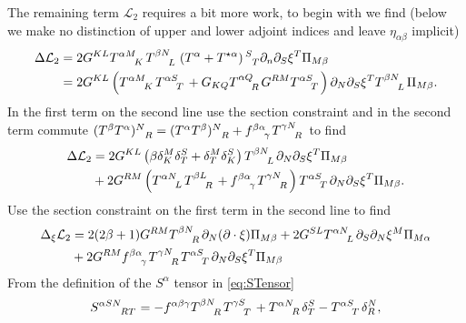 The remaining term $\mathcal{L}_2$ requires a bit more work, to begin with we find (below we make no distinction of upper and lower adjoint indices and leave $\eta_{\alpha\beta}$ implicit)
\begin{equation}
    \begin{aligned}
    \Delta \mathcal{L}_2 &= 2G^{KL}\tensor{T}{^{\alpha M}_K}\tensor{T}{^{\beta N}_L}\left(T^\alpha+T^{\star\alpha}\right)\tensor{}{^S_T}\pd_n\pd_S\xi^T\Pi_{M\beta}\\
    &= 2G^{KL}\left(\tensor{T}{^{\alpha M}_K}\tensor{T}{^{\alpha S}_T}+G_{KQ}\tensor{T}{^{\alpha Q}_R}G^{RM}\tensor{T}{^{\alpha S}_T}\right)\pd_N\pd_S\xi^T\tensor{T}{^{\beta N}_L}\Pi_{M\beta}.
    \end{aligned}
\end{equation}
In the first term on the second line use the section constraint and in the second term commute $(T^\beta T^\alpha)\tensor{}{^N_R} = (T^{\alpha}T^\beta)\tensor{}{^N_R}+\tensor{f}{^{\beta\alpha}_\gamma}\tensor{T}{^{\gamma N}_R}$ to find 
\begin{equation}
    \begin{aligned}
        \Delta \mathcal{L}_2 &= 2G^{KL}\left(\beta\delta^M_K\delta^S_T+\delta^M_T\delta^S_K\right)\tensor{T}{^{\beta N}_L}\pd_N\pd_S\xi^T\Pi_{M\beta}\\
        &+ 2G^{RM}\left(\tensor{T}{^{\alpha N}_L}\tensor{T}{^{\beta L}_R}+\tensor{f}{^{\beta\alpha}_\gamma}\tensor{T}{^{\gamma N}_R}\right)\tensor{T}{^{\alpha S}_T}\pd_N\pd_S\xi^T\Pi_{M\beta}.
    \end{aligned}
\end{equation}
Use the section constraint on the first term in the second line to find 
\begin{equation}\label{eq:Peter}
    \begin{aligned}
        \Delta_\xi \mathcal{L}_2 &= 2(2\beta+1)G^{RM}\tensor{T}{^{\beta N}_R}\pd_N(\pd\cdot\xi)\Pi_{M\beta}+2G^{SL}\tensor{T}{^{\alpha N}_L}\pd_S\pd_N\xi^M\Pi_{M\alpha}\\
        &+2G^{RM}\tensor{f}{^{\beta\alpha}_\gamma}\tensor{T}{^{\gamma N}_R}\tensor{T}{^{\alpha S}_T}\pd_N\pd_S\xi^T\Pi_{M\beta}
    \end{aligned}
\end{equation}
From the definition of the $S^\alpha$ tensor in \eqref{eq:STensor}
\begin{equation}
    \tensor{S}{^{\alpha SN}_{RT}} = -\tensor{f}{^{\alpha\beta\gamma}}\tensor{T}{^{\beta N}_R}\tensor{T}{^{\gamma S}_T}+\tensor{T}{^{\alpha N}_R}\delta^S_T-\tensor{T}{^{\alpha S}_T}\delta^N_R,
\end{equation}
